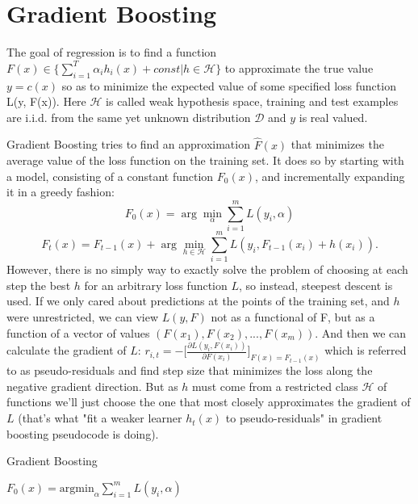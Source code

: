 \documentclass{article} %
\begin{document}
\section{Gradient Boosting}
The goal of regression is to find a function $F(x) \in \{\sum_{i=1}^{T}\alpha_ih_i(x)+const \big| h \in \mathcal{H}\}$ to approximate the true value $y=c(x)$ so as to minimize the expected value of some specified loss function L(y, F(x)). Here $\mathcal{H}$ is called weak hypothesis space, training and test examples are i.i.d. from the same yet unknown distribution $\mathcal{D}$ and $y$ is real valued.

Gradient Boosting tries to find an approximation $\hat{F}(x)$ that minimizes the average value of the loss function on the training set. It does so by starting with a model, consisting of a constant function $F_0(x)$, and incrementally expanding it in a greedy fashion:
\[F_0(x)=\arg\min_\alpha \sum_{i=1}^{m}L(y_i,\alpha)\]
\[F_t(x)=F_{t-1}(x)+\arg\min_{h \in \mathcal{H}} \sum_{i=1}^{m}L(y_i, F_{t-1}(x_i)+h(x_i)).\]
However, there is no simply way to exactly solve the problem of choosing at each step the best $h$ for an arbitrary loss function $L$, so instead, steepest descent is used. If we only cared about predictions at the points of the training set, and $h$ were unrestricted, we can view $L(y, F)$ not as a functional of F, but as a function of a vector of values $( F(x_1),F(x_2),...,F(x_m) )$. And then we can calculate the gradient of $L$: $r_{i,t}=-\big[\frac{\partial L(y_i,F(x_i))}{\partial F(x_i)}\big]_{F(x)=F_{t-1}(x)} $ which is referred to as pseudo-residuals and find step size that minimizes the loss along the negative gradient direction. But as $h$ must come from a restricted class $\mathcal{H}$ of functions we'll just choose the one that most closely approximates the gradient of $L$ (that's what "fit a weaker learner  $h_t(x)$ to pseudo-residuals" in gradient boosting pseudocode is doing).


\begin{algorithm}[H]
\caption{Gradient Boosting}
 \SetAlgoLined

  \BlankLine
 $F_0(x)=\text{argmin}_\alpha\sum_{i=1}^mL(y_i,\alpha)$\\

\end{algorithm}
\end{document}

